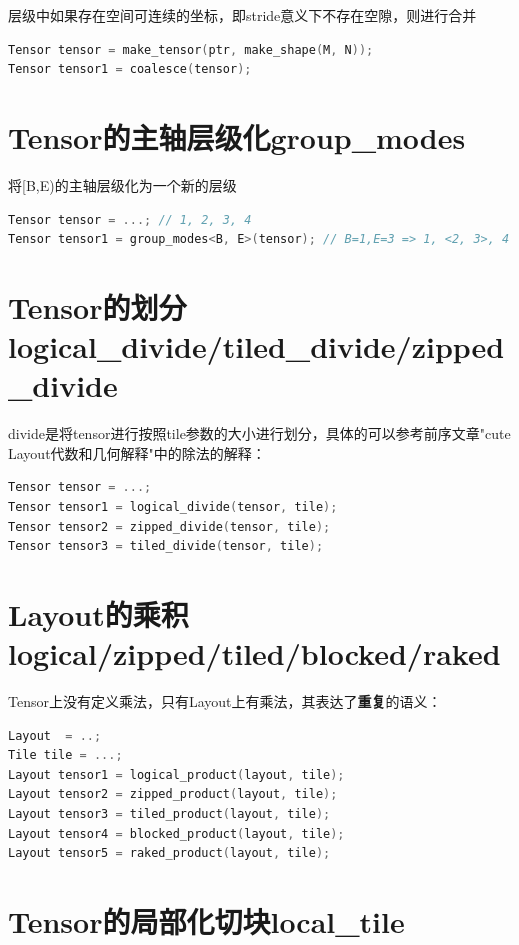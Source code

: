 层级中如果存在空间可连续的坐标，即stride意义下不存在空隙，则进行合并

\begin{lstlisting}[language=C++]
Tensor tensor = make_tensor(ptr, make_shape(M, N));
Tensor tensor1 = coalesce(tensor);
\end{lstlisting}

\section{Tensor的主轴层级化group\_modes}

将[B,E)的主轴层级化为一个新的层级

\begin{lstlisting}[language=C++]
Tensor tensor = ...; // 1, 2, 3, 4
Tensor tensor1 = group_modes<B, E>(tensor); // B=1,E=3 => 1, <2, 3>, 4
\end{lstlisting}

\section{Tensor的划分logical\_divide/tiled\_divide/zipped\_divide}

divide是将tensor进行按照tile参数的大小进行划分，具体的可以参考前序文章"cute Layout代数和几何解释"中的除法的解释：

\begin{lstlisting}[language=C++]
Tensor tensor = ...;
Tensor tensor1 = logical_divide(tensor, tile);
Tensor tensor2 = zipped_divide(tensor, tile);
Tensor tensor3 = tiled_divide(tensor, tile);
\end{lstlisting}

\section{Layout的乘积logical/zipped/tiled/blocked/raked}

Tensor上没有定义乘法，只有Layout上有乘法，其表达了\textbf{重复}的语义：

\begin{lstlisting}[language=C++]
Layout  = ..;
Tile tile = ...;
Layout tensor1 = logical_product(layout, tile);
Layout tensor2 = zipped_product(layout, tile);
Layout tensor3 = tiled_product(layout, tile);
Layout tensor4 = blocked_product(layout, tile);
Layout tensor5 = raked_product(layout, tile);
\end{lstlisting}

\section{Tensor的局部化切块local\_tile}

